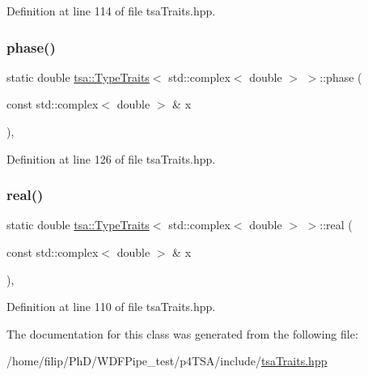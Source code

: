 Definition at line 114 of file tsa\+Traits.\+hpp.

\mbox{\label{classtsa_1_1_type_traits_3_01std_1_1complex_3_01double_01_4_01_4_ae96f4d0c1512efbf11bfb92907115431}} 
\subsubsection{\texorpdfstring{phase()}{phase()}}
{\footnotesize\ttfamily static double \hyperlink{classtsa_1_1_type_traits}{tsa\+::\+Type\+Traits}$<$ std\+::complex$<$ double $>$ $>$\+::phase (\begin{DoxyParamCaption}\item[{const std\+::complex$<$ double $>$ \&}]{x }\end{DoxyParamCaption})\hspace{0.3cm}{\ttfamily [inline]}, {\ttfamily [static]}}



Definition at line 126 of file tsa\+Traits.\+hpp.

\mbox{\label{classtsa_1_1_type_traits_3_01std_1_1complex_3_01double_01_4_01_4_ab79705afcbcb0c504ecd924f57c1ed49}} 
\subsubsection{\texorpdfstring{real()}{real()}}
{\footnotesize\ttfamily static double \hyperlink{classtsa_1_1_type_traits}{tsa\+::\+Type\+Traits}$<$ std\+::complex$<$ double $>$ $>$\+::real (\begin{DoxyParamCaption}\item[{const std\+::complex$<$ double $>$ \&}]{x }\end{DoxyParamCaption})\hspace{0.3cm}{\ttfamily [inline]}, {\ttfamily [static]}}



Definition at line 110 of file tsa\+Traits.\+hpp.



The documentation for this class was generated from the following file\+:\begin{DoxyCompactItemize}
\item 
/home/filip/\+Ph\+D/\+W\+D\+F\+Pipe\+\_\+test/p4\+T\+S\+A/include/\hyperlink{tsa_traits_8hpp}{tsa\+Traits.\+hpp}\end{DoxyCompactItemize}
